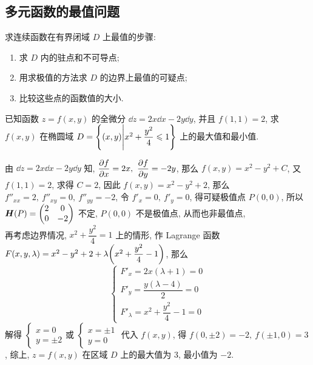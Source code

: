 \subsection{多元函数的最值问题}

求连续函数在有界闭域 $D$ 上最值的步骤:
\begin{enumerate}[label=(\arabic{*})]
    \item 求 $D$ 内的驻点和不可导点;
    \item 用求极值的方法求 $D$ 的边界上最值的可疑点;
    \item 比较这些点的函数值的大小.
\end{enumerate}

\begin{example}[2005 数二]
    已知函数 $z=f(x,y)$ 的全微分 $\dd z=2x\dd x-2y\dd y$, 并且 $f(1,1)=2$, 求 $f(x,y)$ 在椭圆域 $D=\qty{(x,y)\Bigg| x^2+\dfrac{y^2}{4}\leqslant  1 }$ 上的最大值和最小值.
\end{example}
\begin{solution}
    由 $\dd z=2x\dd x-2y\dd y$ 知, $\displaystyle\pdv{f}{x}=2x,~\pdv{f}{y}=-2y$, 那么 $f(x,y)=x^2-y^2+C$, 又 $f(1,1)=2$, 求得 $C=2$, 因此 $f(x,y)=x^2-y^2+2$, 那么 $f''_{xx}=2,~f''_{xy}=0,~f''_{yy}=-2$, 
    令 $f'_x=0,~f'_y=0$, 得可疑极值点 $P(0,0)$, 所以 $\vb*{H}(P)=\mqty(2&0\\0&-2)$ 不定, $P(0,0)$ 不是极值点, 从而也非最值点, \\ 
    再考虑边界情况, $x^2+\dfrac{y^2}{4}=1$ 上的情形, 作 Lagrange 函数 $F(x,y,\lambda)=x^2-y^2+2+\lambda\qty(x^2+\dfrac{y^2}{4}-1)$, 那么 
    $$\begin{cases}
        F'_x=2 x (\lambda + 1)=0\\ 
        F'_y=\dfrac{y (\lambda - 4)}{2}=0\\ 
        F'_\lambda=x^2+\dfrac{y^2}{4}-1=0
    \end{cases}$$ 解得 $\begin{cases}
        x=0\\ y=\pm2
    \end{cases}\text{或 }\begin{cases}
        x=\pm 1\\ y=0
    \end{cases}$ 代入 $f(x,y)$, 得 $f(0,\pm 2)=-2,~f(\pm1,0)=3$, 综上, $z=f(x,y)$ 在区域 $D$ 上的最大值为 $3$, 最小值为 $-2$.
\end{solution}